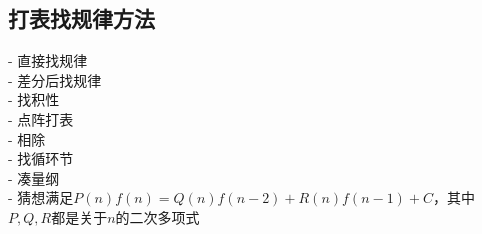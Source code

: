 \documentclass[twocolumn,a4]{article}%
\begin{document}
\subsection{打表找规律方法}
    - 直接找规律\\
    - 差分后找规律\\
    - 找积性\\
    - 点阵打表\\
    - 相除\\
    - 找循环节\\
    - 凑量纲\\
    - 猜想满足$P(n)f(n)=Q(n)f(n−2)+R(n)f(n−1)+C$，其中$P,Q,R$都是关于$n$的二次多项式\\
\end{document}
